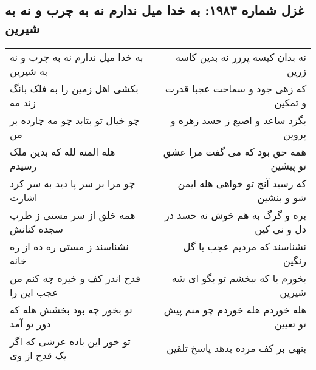 \begin{center}
\section*{غزل شماره ۱۹۸۳: به خدا میل ندارم نه به چرب و نه به شیرین}
\label{sec:1983}
\begin{longtable}{l p{0.5cm} r}
به خدا میل ندارم نه به چرب و نه به شیرین
&&
نه بدان کیسه پرزر نه بدین کاسه زرین
\\
بکشی اهل زمین را به فلک بانگ زند مه
&&
که زهی جود و سماحت عجبا قدرت و تمکین
\\
چو خیال تو بتابد چو مه چارده بر من
&&
بگزد ساعد و اصبع ز حسد زهره و پروین
\\
هله المنه لله که بدین ملک رسیدم
&&
همه حق بود که می گفت مرا عشق تو پیشین
\\
چو مرا بر سر پا دید به سر کرد اشارت
&&
که رسید آنچ تو خواهی هله ایمن شو و بنشین
\\
همه خلق از سر مستی ز طرب سجده کنانش
&&
بره و گرگ به هم خوش نه حسد در دل و نی کین
\\
نشناسند ز مستی ره ده از ره خانه
&&
نشناسند که مردیم عجب یا گل رنگین
\\
قدح اندر کف و خیره چه کنم من عجب این را
&&
بخورم یا که ببخشم تو بگو ای شه شیرین
\\
تو بخور چه بود بخشش هله که دور تو آمد
&&
هله خوردم هله خوردم چو منم پیش تو تعیین
\\
تو خور این باده عرشی که اگر یک قدح از وی
&&
بنهی بر کف مرده بدهد پاسخ تلقین
\\
\end{longtable}
\end{center}
